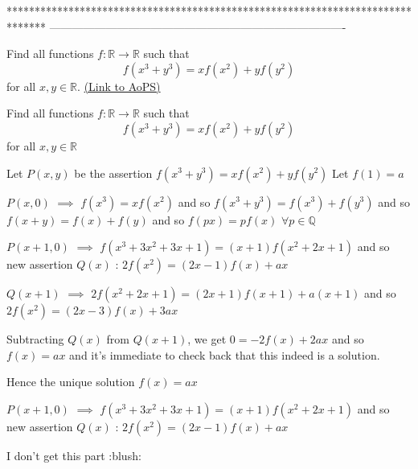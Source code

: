 *******************************************************************************
-------------------------------------------------------------------------------

\begin{problem}
	Find all functions $ f: \mathbb{R}\rightarrow\mathbb{R}$ such that
\[ f(x^3+y^3)=xf(x^2)+yf(y^2)\]
for all $ x,y\in\mathbb{R}$.
	\flushright \href{https://artofproblemsolving.com/community/c6h309219}{(Link to AoPS)}
\end{problem}



\begin{solution}
	\begin{tcolorbox}Find all functions $ f: \mathbb{R}\rightarrow\mathbb{R}$ such that
\[ f(x^3 + y^3) = xf(x^2) + yf(y^2)\]
for all $ x,y\in\mathbb{R}$\end{tcolorbox}

Let $ P(x,y)$ be the assertion $ f(x^3+y^3)=xf(x^2)+yf(y^2)$
Let $ f(1)=a$

$ P(x,0)$ $ \implies$ $ f(x^3)=xf(x^2)$ and so $ f(x^3+y^3)=f(x^3)+f(y^3)$ and so $ f(x+y)=f(x)+f(y)$ and so $ f(px)=pf(x)$ $ \forall p\in\mathbb Q$

$ P(x+1,0)$ $ \implies$ $ f(x^3+3x^2+3x+1)=(x+1)f(x^2+2x+1)$ and so new assertion $ Q(x)$ : $ 2f(x^2)=(2x-1)f(x)+ax$

$ Q(x+1)$ $ \implies$ $ 2f(x^2+2x+1)=(2x+1)f(x+1)+a(x+1)$ and so $ 2f(x^2)=(2x-3)f(x)+3ax$

Subtracting $ Q(x)$ from $ Q(x+1)$, we get $ 0=-2f(x)+2ax$ and so $ f(x)=ax$ and it's immediate to check back that this indeed is a solution.

Hence the unique solution $ \boxed{f(x)=ax}$
\end{solution}



\begin{solution}
	\begin{tcolorbox}

$ P(x + 1,0)$ $ \implies$ $ f(x^3 + 3x^2 + 3x + 1) = (x + 1)f(x^2 + 2x + 1)$ and so new assertion $ Q(x)$ : $ 2f(x^2) = (2x - 1)f(x) + ax$
\end{tcolorbox}
I don't get this part  :blush:
\end{solution}



